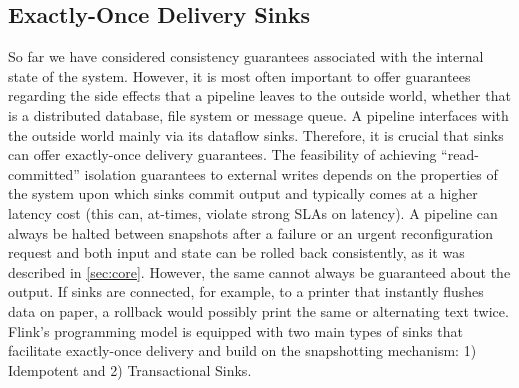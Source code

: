 \subsection{Exactly-Once Delivery Sinks}
\label{sec:outputcommit}



So far we have considered consistency guarantees associated with the internal state of the system. However, it is most often important to offer guarantees regarding the side effects that a pipeline leaves to the outside world, whether that is a distributed database, file system or message queue. A pipeline interfaces with the outside world mainly via its dataflow sinks. Therefore, it is crucial that sinks can offer exactly-once delivery guarantees. The feasibility of achieving ``read-committed'' isolation guarantees to external writes depends on the properties of the system upon which sinks commit output and typically comes at a higher latency cost (this can, at-times, violate strong SLAs on latency). A pipeline can always be halted between snapshots after a failure or an urgent reconfiguration request and both input and state can be rolled back consistently, as it was described in \autoref{sec:core}. However, the same cannot always be guaranteed about the output. If sinks are connected, for example, to a printer that instantly flushes data on paper, a rollback would possibly print the same or alternating text twice. Flink's programming model is equipped with two main types of sinks that facilitate exactly-once delivery and build on the snapshotting mechanism: 1) Idempotent and 2) Transactional Sinks.



